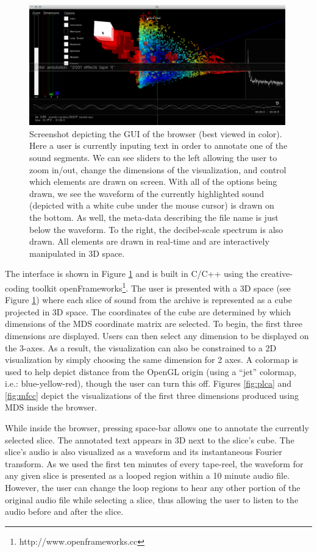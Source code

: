 \documentclass[a4paper,10pt,final]{ThesisStyle}
\begin{document}
\begin{figure}
  \centering
  \label{fig:gui}\includegraphics[width=0.99\textwidth]{images/gui.pdf}
  \caption{Screenshot depicting the GUI of the browser (best viewed in color).  Here a user is currently inputing text in order to annotate one of the sound segments.  We can see sliders to the left allowing the user to zoom in/out, change the dimensions of the visualization, and control which elements are drawn on screen.  With all of the options being drawn, we see the waveform of the currently highlighted sound (depicted with a white cube under the mouse cursor) is drawn on the bottom.  As well, the meta-data describing the file name is just below the waveform.  To the right, the decibel-scale spectrum is also drawn.  All elements are drawn in real-time and are interactively manipulated in 3D space.}
\end{figure}

The interface is shown in Figure \ref{fig:gui} and is built in C/C++ using the creative-coding toolkit openFrameworks\footnote{http://www.openframeworks.cc}.  The user is presented with a 3D space (see Figure \ref{fig:gui}) where each slice of sound from the archive is represented as a cube projected in 3D space.  The coordinates of the cube are determined by which dimensions of the MDS coordinate matrix are selected.  To begin, the first three dimensions are displayed.  Users can then select any dimension to be displayed on the 3-axes.  As a result, the visualization can also be constrained to a 2D visualization by simply choosing the same dimension for 2 axes.  A colormap is used to help depict distance from the OpenGL origin (using a ``jet'' colormap, i.e.: blue-yellow-red), though the user can turn this off.  Figures \ref{fig:plca} and \ref{fig:mfcc} depict the visualizations  of the first three dimensions produced using MDS inside the browser.  

While inside the browser, pressing space-bar allows one to annotate the currently selected slice.  The annotated text appears in 3D next to the slice's cube.  The slice's audio is also visualized as a waveform and its instantaneous Fourier transform.  As we used the first ten minutes of every tape-reel, the waveform for any given slice is presented as a looped region within a 10 minute audio file.  However, the user can change the loop regions to hear any other portion of the original audio file while selecting a slice, thus allowing the user to listen to the audio before and after the slice.
\end{document}
